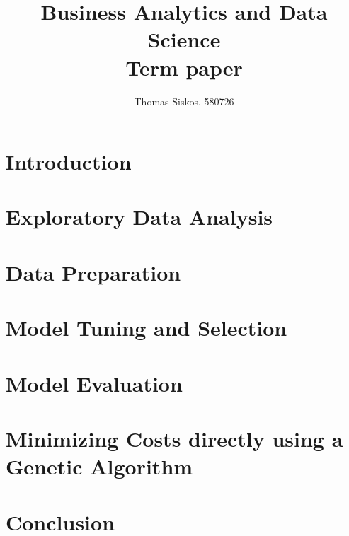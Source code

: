 \documentclass{article}
\begin{document}
\title{Business Analytics and Data Science \\
       \large Term paper}
\author{Thomas Siskos, 580726}

\maketitle

\section{Introduction}


\section{Exploratory Data Analysis}


\section{Data Preparation}


\section{Model Tuning and Selection}


\section{Model Evaluation}


\section{Minimizing Costs directly using a Genetic Algorithm}


\section{Conclusion}




\end{document}

